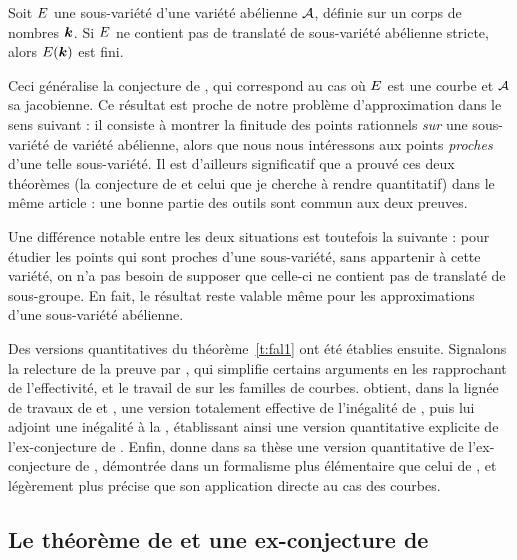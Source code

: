 \begin{thm} \label{t:fal1}
  Soit $E$ une sous-variété d'une variété abélienne $\mathcal A$, définie sur un
  corps de nombres ${\boldsymbol k}$. Si $E$ ne contient pas de translaté de sous-variété
  abélienne stricte, alors $E({\boldsymbol k})$ est fini.
\end{thm}

Ceci généralise la conjecture de , qui correspond au cas où $E$
est une courbe et $\mathcal A$ sa jacobienne. Ce résultat est proche de notre problème
d'approximation dans le sens suivant : il consiste à montrer la finitude des
points rationnels \emph{sur} une sous-variété de variété abélienne, alors que
nous nous intéressons aux points \emph{proches} d'une telle sous-variété. Il
est d'ailleurs significatif que  a prouvé ces deux théorèmes (la
conjecture de  et celui que je cherche à rendre quantitatif)
dans le même article : une bonne partie des outils sont commun aux deux
preuves.

Une différence notable entre les deux situations est toutefois la suivante :
pour étudier les points qui sont proches d'une sous-variété, sans appartenir
à cette variété, on n'a pas besoin de supposer que celle-ci ne contient pas de
translaté de sous-groupe. En fait, le résultat reste valable même pour les
approximations d'une sous-variété abélienne.

Des versions quantitatives du théorème~\ref{t:fal1} ont été établies ensuite.
Signalons la relecture de la preuve par , qui simplifie certains
arguments en les rapprochant de l'effectivité, et le travail de 
sur les familles de courbes.  obtient, dans la lignée de travaux de
 et , une version totalement effective de
l'inégalité de  \cite{remivds}, puis lui adjoint une inégalité à la
, établissant ainsi une version quantitative \cite{remdcl}
explicite de l'ex-conjecture de . Enfin, 
\cite[chapitre~3]{farhith} donne dans sa thèse une version quantitative de
l'ex-conjecture de , démontrée dans un formalisme plus élémentaire
que celui de , et légèrement plus précise que son application
directe au cas des courbes.


\subsection{Le théorème de  et une ex-conjecture de }
\label{s:siegel}

